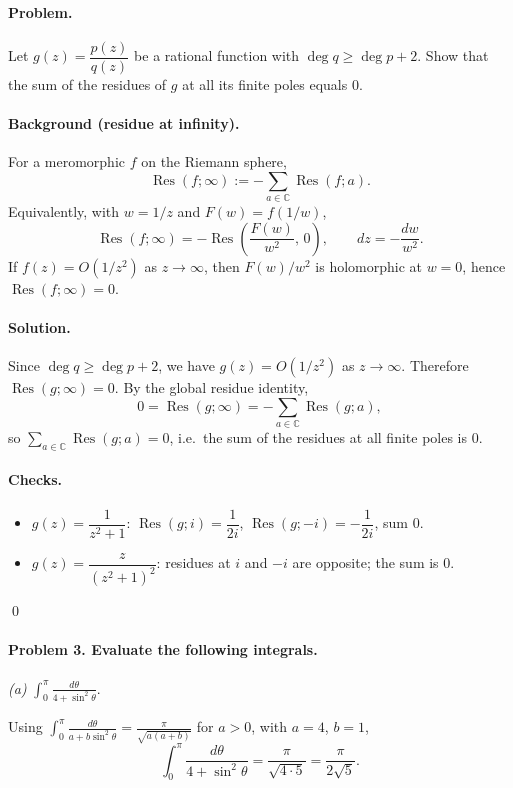 \documentclass[11pt,a4paper]{article}
\theoremstyle{definition}
\theoremstyle{definition}
\theoremstyle{plain}
\theoremstyle{remark}
\DeclareMathOperator{\Res}{Res}
\begin{document}
\paragraph{Problem.}
Let $g(z)=\dfrac{p(z)}{q(z)}$ be a rational function with $\deg q\ge \deg p+2$.
Show that the sum of the residues of $g$ at all its finite poles equals $0$.

\paragraph{Background (residue at infinity).}
For a meromorphic $f$ on the Riemann sphere,
\[
\Res(f;\infty):=-\sum_{a\in\mathbb C}\Res(f;a).
\]
Equivalently, with $w=1/z$ and $F(w)=f(1/w)$,
\[
\Res(f;\infty)=-\Res\!\left(\frac{F(w)}{w^{2}},\,0\right),
\qquad dz=-\frac{dw}{w^{2}}.
\]
If $f(z)=O(1/z^{2})$ as $z\to\infty$, then $F(w)/w^{2}$ is holomorphic at $w=0$, hence $\Res(f;\infty)=0$.

\medskip
\paragraph{Solution.}
Since $\deg q\ge \deg p+2$, we have $g(z)=O(1/z^{2})$ as $z\to\infty$.
Therefore $\Res(g;\infty)=0$. By the global residue identity,
\[
0=\Res(g;\infty)=-\sum_{a\in\mathbb C}\Res(g;a),
\]
so $\displaystyle \sum_{a\in\mathbb C}\Res(g;a)=0$, i.e.\ the sum of the residues at all finite poles is $0$.

\medskip
\paragraph{Checks.}
\begin{itemize}
	\item $g(z)=\dfrac{1}{z^{2}+1}$: $\Res(g;i)=\dfrac{1}{2i}$, $\Res(g;-i)=-\dfrac{1}{2i}$, sum $0$.
	\item $g(z)=\dfrac{z}{(z^{2}+1)^{2}}$: residues at $i$ and $-i$ are opposite; the sum is $0$.
\end{itemize}
\qed

\paragraph{Problem 3. Evaluate the following integrals.}

\medskip
\emph{(a)} $\displaystyle \int_{0}^{\pi}\frac{d\theta}{4+\sin^{2}\theta}$.

Using $\displaystyle \int_{0}^{\pi}\frac{d\theta}{a+b\sin^{2}\theta}
=\frac{\pi}{\sqrt{a(a+b)}}$ for $a>0$, with $a=4$, $b=1$,
\[
\int_{0}^{\pi}\frac{d\theta}{4+\sin^{2}\theta}
=\frac{\pi}{\sqrt{4\cdot 5}}=\boxed{\frac{\pi}{2\sqrt5}}.
\]
\end{document}
